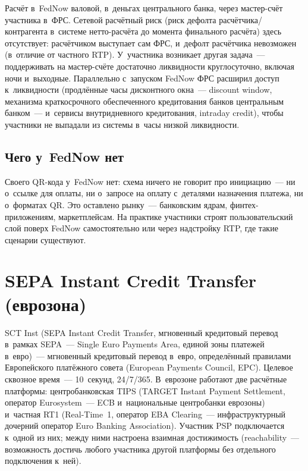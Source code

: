 Расчёт в~FedNow валовой, в~деньгах центрального банка, через
мастер-счёт участника в~ФРС. Сетевой расчётный риск (риск дефолта расчётчика/контрагента в~системе
нетто-расчёта до момента финального расчёта) здесь отсутствует:
расчётчиком выступает сам ФРС, и~дефолт расчётчика невозможен
(в~отличие от частного RTP). У~участника возникает другая задача~---
поддерживать на мастер-счёте достаточно ликвидности круглосуточно,
включая ночи и~выходные. Параллельно с~запуском FedNow ФРС расширил
доступ к~ликвидности (продлённые часы дисконтного окна~--- discount
window, механизма краткосрочного обеспеченного кредитования банков
центральным банком~--- и~сервисы внутридневного кредитования, intraday
credit), чтобы участники не выпадали из системы в~часы низкой ликвидности.

\subsection*{Чего у~FedNow нет}\label{subsec:fednow-gaps}

Своего QR-кода у~FedNow нет: схема ничего не говорит про инициацию~---
ни о~ссылке для оплаты, ни о~запросе на оплату с~деталями назначения
платежа, ни о~форматах QR. Это оставлено рынку~--- банковским
ядрам, финтех-приложениям, маркетплейсам. На практике участники
строят пользовательский слой поверх FedNow самостоятельно или через
надстройку RTP, где такие сценарии существуют.

\section{SEPA Instant Credit Transfer (еврозона)}\label{sec:sepa-instant-system}

SCT Inst (SEPA Instant Credit Transfer, мгновенный кредитовый перевод
в~рамках SEPA~--- Single Euro Payments Area, единой зоны платежей в~евро)~---
мгновенный кредитовый перевод в~евро, определённый правилами Европейского
платёжного совета (European Payments Council, EPC). Целевое сквозное
время~--- 10~секунд, 24/7/365. В~еврозоне работают две расчётные
платформы: центробанковская TIPS (TARGET Instant Payment Settlement,
оператор Eurosystem~--- ECB и~национальные центробанки еврозоны)~\cite{ecb-tips}
и~частная RT1 (Real-Time~1, оператор EBA Clearing~--- инфраструктурный
дочерний оператор Euro Banking Association). Участник PSP подключается
к~одной из них; между ними настроена взаимная достижимость
(reachability~--- возможность достичь любого участника другой платформы
без отдельного подключения к~ней).

